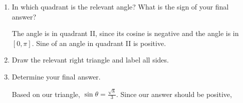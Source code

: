 \documentclass[main]{subfiles}
\begin{document}
\begin{enumerate}[resume]
\begin{enumerate}[topsep=0pt]
\begin{enumerate}[topsep=0pt]
            \item
              \begin{problem}[0.25in]
                In which quadrant is the relevant angle?
                What is the sign of your final answer?
              \end{problem}

              \begin{solution}
                The angle is in quadrant II, since its cosine is negative and
                the angle is in $[0,\pi]$. Sine of an angle in quadrant II is
                positive.
              \end{solution}

            \item
              \begin{problem}[\vfill]
                Draw the relevant right triangle and label all sides.
              \end{problem}

              \begin{solution}
              
              \end{solution}

            \item
              \begin{problem}[0.25in]
                Determine your final answer.
              \end{problem}

              \begin{solution}
                Based on our triangle, $\sin \theta = \frac{\sqrt8}{3}$. Since
                our answer should be positive, 
              \end{solution}
        \end{enumerate}


\end{enumerate}
\end{enumerate}
\end{document}
